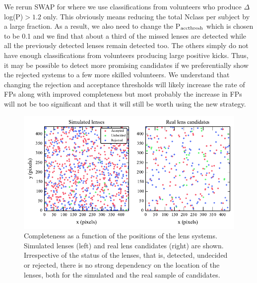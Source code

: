 \documentclass[useAMS,usenatbib,a4paper]{mn2e}
\begin{document}
We rerun SWAP for \StageOne where we use classifications from volunteers
who produce $\Delta$ log(P)$>1.2$ only. This obviously means reducing
the total Nclass per subject by a large fraction. As a result, we also
need to change the P$_{\rm acc thresh}$ which is chosen to be 0.1 and we
find that about a third of the missed lenses are detected while all the
previously detected lenses remain detected too. The others simply do not
have enough classifications from volunteers producing large positive
kicks. Thus, it may be possible to detect more promising candidates if
we preferentially show the rejected systems to a few more skilled
volunteers. We understand that changing the rejection and acceptance
thresholds will likely increase the rate of FPs along with
improved completeness but most probably the increase in FPs will not be
too significant and that it will still be worth using the new strategy.


\begin{figure}
\begin{center}
\includegraphics[scale=0.95]{sw-cfhtls-figs/completeness_pos.pdf}
\caption{ \label{fig:comppos}
Completeness as a function of the positions of the lens systems. Simulated lenses
(left) and real lens candidates (right) are shown. Irrespective of the
status of the lenses, that is, detected, undecided or rejected, there is
no strong dependency on the location of the lenses, both for the
simulated and the real sample of candidates. }
\end{center}
\end{figure}
\end{document}
